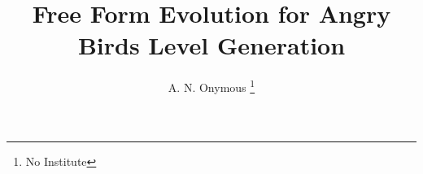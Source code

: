 \documentclass[runningheads,a4paper]{llncs}
\begin{document}
\mainmatter  %

\title{Free Form Evolution for Angry Birds Level Generation}

\titlerunning{}

%
%

\author{A. N. Onymous%
\thanks{No Institute}}



%
%

\maketitle
\end{document}
